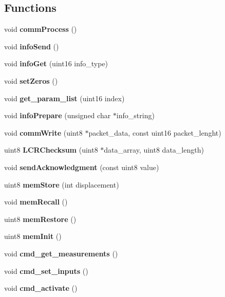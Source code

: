\subsection*{Functions}
\begin{DoxyCompactItemize}
\item 
\mbox{\label{command__processing_8c_a2e5d1711e19837adc3e8f479af3ae509}} 
void {\bfseries comm\+Process} ()
\item 
\mbox{\label{command__processing_8c_af5dcf9e6d2a6421fbe636487e7f9f240}} 
void {\bfseries info\+Send} ()
\item 
\mbox{\label{command__processing_8c_a525ccbc7ac3901d938dc352172ee2531}} 
void {\bfseries info\+Get} (uint16 info\+\_\+type)
\item 
\mbox{\label{command__processing_8c_ac8969cb5fdb4916f259075029741e727}} 
void {\bfseries set\+Zeros} ()
\item 
\mbox{\label{command__processing_8c_a5ef086c932682ca5f7549b74ead732aa}} 
void {\bfseries get\+\_\+param\+\_\+list} (uint16 index)
\item 
\mbox{\label{command__processing_8c_abacf855ed80e3052a5bb5b243a0d809e}} 
void {\bfseries info\+Prepare} (unsigned char $\ast$info\+\_\+string)
\item 
\mbox{\label{command__processing_8c_a49ef41d195291783b6c0e25a0da21a84}} 
void {\bfseries comm\+Write} (uint8 $\ast$packet\+\_\+data, const uint16 packet\+\_\+lenght)
\item 
\mbox{\label{command__processing_8c_a6205a6e88f72f4cc321a7d8abca23e26}} 
uint8 {\bfseries L\+C\+R\+Checksum} (uint8 $\ast$data\+\_\+array, uint8 data\+\_\+length)
\item 
\mbox{\label{command__processing_8c_af4a42b25376d2efd09096cbbed2fbce4}} 
void {\bfseries send\+Acknowledgment} (const uint8 value)
\item 
uint8 \textbf{ mem\+Store} (int displacement)
\item 
void \textbf{ mem\+Recall} ()
\item 
uint8 \textbf{ mem\+Restore} ()
\item 
uint8 \textbf{ mem\+Init} ()
\item 
void \textbf{ cmd\+\_\+get\+\_\+measurements} ()
\item 
\mbox{\label{command__processing_8c_a2d8a4542f55af960a27f875b00aad6a1}} 
void {\bfseries cmd\+\_\+set\+\_\+inputs} ()
\item 
\mbox{\label{command__processing_8c_a107fc9f2982f9a953bdd82aa07279499}} 
void {\bfseries cmd\+\_\+activate} ()
\item 

\end{DoxyCompactItemize}

